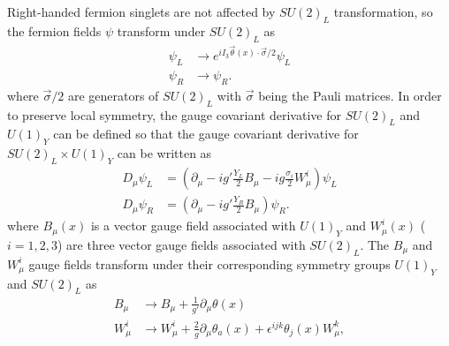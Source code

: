 \documentclass[../thesis.tex]{subfiles}
\begin{document}
Right-handed fermion singlets are not affected by $SU(2)_L$ transformation, so the fermion fields $\psi$ transform under $SU(2)_L$ as
\begin{equation}
\begin{aligned}
\psi_L &\rightarrow e^{iI_3 \vec{\theta}(x)\cdot\vec{\sigma}/2} \psi_L \\
\psi_R &\rightarrow \psi_R.
\end{aligned}
\end{equation}
where $\vec{\sigma}/2$ are generators of $SU(2)_L$ with $\vec{\sigma}$ being the Pauli matrices. In order to preserve local symmetry, the gauge covariant derivative for $SU(2)_L$ and $U(1)_Y$ can be defined \citep{theory:ew} so that the gauge covariant derivative for $SU(2)_L \times U(1)_Y$ can be written as
\begin{equation}
\begin{aligned}
\label{eq:EW_cov}
D_\mu \psi_L &= \left( \partial_\mu - ig'\frac{Y_L}{2}B_\mu - ig\frac{\sigma_i}{2}W_\mu^i \right) \psi_L \\
D_\mu \psi_R &= \left( \partial_\mu - ig'\frac{Y_R}{2}B_\mu \right) \psi_R.
\end{aligned}
\end{equation}
where $B_\mu(x)$ is a vector gauge field associated with $U(1)_Y$ and $W_\mu^i (x)$ ($i=1,2,3$) are three vector gauge fields associated with $SU(2)_L$. The $B_\mu$ and $W_\mu^i$ gauge fields transform under their corresponding symmetry groups $U(1)_Y$ and $SU(2)_L$ as
\begin{equation}
\begin{aligned}
B_\mu &\rightarrow B_\mu + \frac{1}{g'}\partial_\mu \theta(x) \\
W_\mu^i 
&\rightarrow W_\mu^i + \frac{2}{g}\partial_\mu \theta_a(x) + \epsilon^{ijk}\theta_j(x) W_\mu^k,
\end{aligned}
\end{equation}
\end{document}
